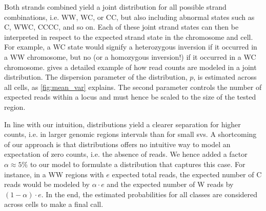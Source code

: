 Both strands combined yield a joint distribution for all possible strand
combinations, i.e. WW, WC, or CC, but also including abnormal states such as C, WWC, CCCC,
and so on. Each of these joint strand states can then be interpreted in respect
to the expected strand state in the chromosome and cell. For example, a WC state would
signify a heterozygous inversion if it occurred in a WW chromosome, but no \sv
(or a homozygous inversion!) if it occurred in a WC chromosome.
 gives a detailed example of how read counts are modeled
in a joint \nb distribution. The dispersion parameter of the \nb distribution,
$p$, is estimated across all cells, as \cref{fig:mean_var} explains. The second
\nb parameter controls the number of expected reads within a locus and must
hence be scaled to the size of the tested region.

In line with our intuition,
\nb distributions yield a clearer separation for higher counts, i.e. in larger
genomic regions intervals than for small \acp{sv}. A shortcoming of our
approach is that \nb distributions offers no intuitive way to model an
expectation of zero counts, i.e. the absence of reads. We hence added a factor
$\alpha \approx 5\%$ to our model to formulate a \nb distribution that captures
this case. For instance, in a WW regions with $e$ expected total reads, the
expected number of C reads would be modeled by $\alpha \cdot e$ and the expected
number of W reads by $(1-\alpha) \cdot e$. In the end, the
estimated \nb probabilities for all \sv classes are considered across cells to
make a final \sv call.


